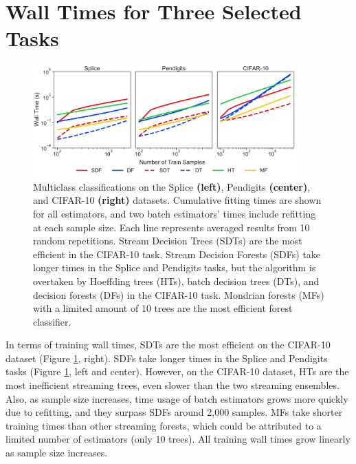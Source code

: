 \section{Wall Times for Three Selected Tasks}
\label{app:select_time}

\begin{figure}[!htb]
\centering
\includegraphics[width=0.9\textwidth]{select_time}
  \caption{Multiclass classifications on the Splice \textbf{(left)}, Pendigits \textbf{(center)}, and CIFAR-10 \textbf{(right)} datasets. Cumulative fitting times are shown for all estimators, and two batch estimators' times include refitting at each sample size. Each line represents averaged results from 10 random repetitions. Stream Decision Trees (SDTs) are the most efficient in the CIFAR-10 task. Stream Decision Forests (SDFs) take longer times in the Splice and Pendigits tasks, but the algorithm is overtaken by Hoeffding trees (HTs), batch decision trees (DTs), and decision forests (DFs) in the CIFAR-10 task. Mondrian forests (MFs) with a limited amount of 10 trees are the most efficient forest classifier.
  }
\label{fig:select_time}
\end{figure}

In terms of training wall times, SDTs are the most efficient on the CIFAR-10 dataset (Figure \ref{fig:select_time}, right). 
SDFs take longer times in the Splice and Pendigits tasks (Figure \ref{fig:select_time}, left and center). However, on the CIFAR-10 dataset, HTs are the most inefficient streaming trees, even slower than the two streaming ensembles. Also, as sample size increases, time usage of batch estimators grows more quickly due to refitting, and they surpass SDFs around 2,000 samples. MFs take shorter training times than other streaming forests, which could be attributed to a limited number of estimators (only 10 trees). All training wall times grow linearly as sample size increases.

